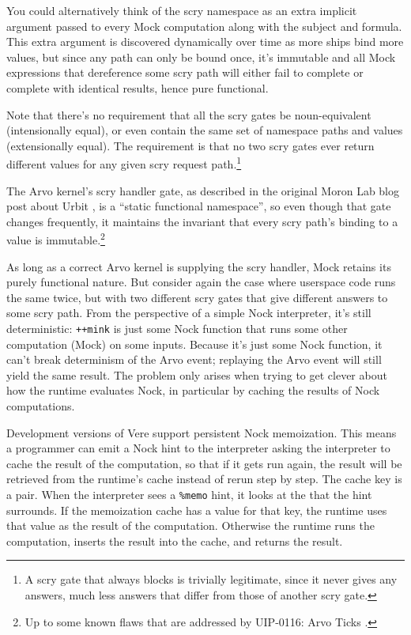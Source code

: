 \documentclass[twoside]{article}
\begin{document}
You could alternatively think of the scry namespace as an extra implicit argument passed to every Mock computation along with the subject and formula.  This extra argument is discovered dynamically over time as more ships bind more values, but since any path can only be bound once, it's immutable and all Mock expressions that dereference some scry path will either fail to complete or complete with identical results, hence pure functional.

Note that there's no requirement that all the scry gates be noun-equivalent (intensionally equal), or even contain the same set of namespace paths and values (extensionally equal). The requirement is that no two scry gates ever return different values for any given scry request path.\footnote{A scry gate that always blocks is trivially legitimate, since it never gives any answers, much less answers that differ from those of another scry gate.}

The Arvo kernel's scry handler gate, as described in the original Moron Lab blog post about Urbit \citep{Yarvin2010}, is a ``static functional namespace'', so even though that gate changes frequently, it maintains the invariant that every scry path's binding to a value is immutable.\footnote{Up to some known flaws that are addressed by UIP-0116: Arvo Ticks \citep{Monk2023, Monk2023a, Wilson2024}.}

As long as a correct Arvo kernel is supplying the scry handler, Mock retains its purely functional nature.  But consider again the case where userspace code runs the same \texttt{} twice, but with two different scry gates that give different answers to some scry path. From the perspective of a simple Nock interpreter, it's still deterministic:  \texttt{++mink} is just some Nock function that runs some other computation (Mock) on some inputs.  Because it's just some Nock function, it can't break determinism of the Arvo event; replaying the Arvo event will still yield the same result.  The problem only arises when trying to get clever about how the runtime evaluates Nock, in particular by caching the results of Nock computations.

Development versions of Vere support persistent Nock memoization.  This means a programmer can emit a Nock hint to the interpreter asking the interpreter to cache the result of the computation, so that if it gets run again, the result will be retrieved from the runtime's cache instead of rerun step by step.  The cache key is a \texttt{} pair.  When the interpreter sees a \texttt{\%memo} hint, it looks at the \texttt{} that the hint surrounds. If the memoization cache has a value for that key, the runtime uses that value as the result of the computation.  Otherwise the runtime runs the computation, inserts the result into the cache, and returns the result.
\end{document}
